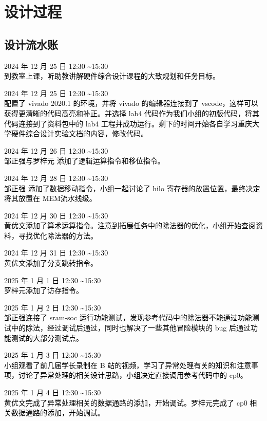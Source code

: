 \section{设计过程}
\subsection{设计流水账}
\textcolor{black}{

2024 年 12 月 25 日 12:30 \sim 15:30\\
到教室上课，听助教讲解硬件综合设计课程的大致规划和任务目标。

2024 年 12 月 25 日 12:30 \sim 15:30\\
配置了 vivado 2020.1 的环境，并将 vivado 的编辑器连接到了 vscode，这样可以获得更清晰的代码高亮和补正。并选择 lab4 代码作为我们小组的初版代码，将其代码连接到了资料包中的 lab4 工程并成功运行。剩下的时间开始各自学习重庆大学硬件综合设计实验文档的内容，修改代码。

2024 年 12 月 26 日 12:30 \sim 15:30\\
邹正强与罗梓元 添加了逻辑运算指令和移位指令。

2024 年 12 月 28 日 12:30 \sim 15:30\\
邹正强 添加了数据移动指令，小组一起讨论了 hilo 寄存器的放置位置，最终决定将其放置在 MEM流水线级。

2024 年 12 月 30 日 12:30 \sim 15:30\\
黄优文添加了算术运算指令。注意到拓展任务中的除法器的优化，小组开始查阅资料，寻找优化除法器的方法。

2024 年 12 月 31 日 12:30 \sim 15:30\\
黄优文添加了分支跳转指令。
 
2025 年 1 月 1 日 12:30 \sim 15:30\\
罗梓元添加了访存指令。

2025 年 1 月 2 日 12:30 \sim 15:30\\
邹正强连接了 sram-soc 运行功能测试，发现参考代码中的除法器不能通过功能测试中的除法，经过调试后通过，同时也解决了一些其他冒险模块的 bug 后通过功能测试的大部分测试点。

2025 年 1 月 3 日 12:30 \sim 15:30\\
小组观看了前几届学长录制在 B 站的视频，学习了异常处理有关的知识和注意事项，讨论了异常处理的相关设计思路，小组决定直接调用参考代码中的 cp0。

2025 年 1 月 4 日 12:30 \sim 15:30\\
黄优文完成了异常处理相关的数据通路的添加，开始调试。罗梓元完成了 cp0 相关数据通路的添加，开始调试。

}
